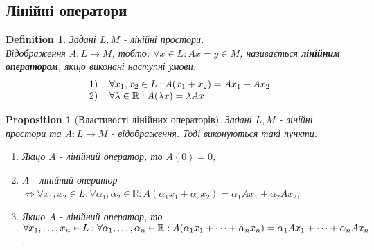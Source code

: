 \documentclass[a4paper, 10pt]{article}
\theoremstyle{theoremdd}
\newtheorem{definition}[theorem]{Definition}
\newtheorem{proposition}[theorem]{Proposition}
\begin{document}
	\subsection{Лінійні оператори}
	\begin{definition}
	Задані $L,M$ - лінійні простори.\\
	Відображення $A \colon L \to M$, тобто: $\forall x \in L: Ax=y \in M$, називається \textbf{лінійним оператором}, якщо виконані наступні умови:
	\begin{align*}
	\begin{tabular}{cl}
	1) & $\forall x_1,x_2 \in L: A(x_1+x_2)=Ax_1+Ax_2$\\
	2) & $\forall \lambda \in \mathbb{R}: A(\lambda x) = \lambda Ax$
	\end{tabular}
	\end{align*}
	\end{definition}
	
	\begin{proposition}[Властивості лінійних операторів]
	Задані $L,M$ - лінійні простори та $A \colon L \to M$ - відображення. Тоді виконуються такі пункти:
	\begin{enumerate}[nosep, wide=0pt, label={\arabic*)}]
	\item Якщо $A$ - лінійний оператор, то $A(0) = 0$;
	\item $A$ - лінійний оператор $\iff \forall x_1,x_2 \in L: \forall \alpha_1, \alpha_2 \in \mathbb{R}: A(\alpha_1 x_1 + \alpha_2 x_2) = \alpha_1 Ax_1 + \alpha_2 Ax_2$;
	\item Якщо $A$ - лінійний оператор, то $\forall x_1,\dots, x_n \in L: \forall \alpha_1, \dots, \alpha_n \in \mathbb{R}: \\ A(\alpha_1 x_1 + \dots + \alpha_n x_n) = \alpha_1 Ax_1 + \dots + \alpha_n Ax_n$.
	\end{enumerate}
	\end{proposition}
	
\end{document}
